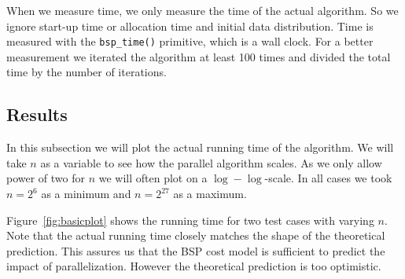 When we measure time, we only measure the time of the actual algorithm. So we ignore start-up time or allocation time and initial data distribution. Time is measured with the \texttt{bsp\_time()} primitive, which is a wall clock. For a better measurement we iterated the algorithm at least 100 times and divided the total time by the number of iterations.

\subsection{Results}
In this subsection we will plot the actual running time of the algorithm. We will take $n$ as a variable to see how the parallel algorithm scales. As we only allow power of two for $n$ we will often plot on a $\log-\log$-scale. In all cases we took $n=2^6$ as a minimum and $n=2^{27}$ as a maximum.

Figure~\ref{fig:basicplot} shows the running time for two test cases with varying $n$. Note that the actual running time closely matches the shape of the theoretical prediction. This assures us that the BSP cost model is sufficient to predict the impact of parallelization. However the theoretical prediction is too optimistic.

